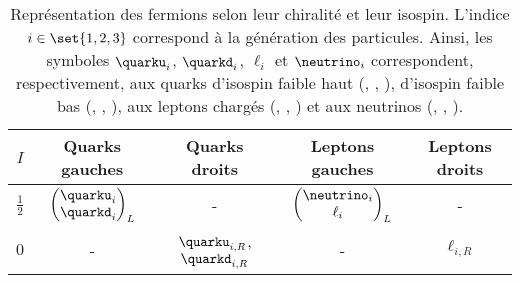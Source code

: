 \begin{table}[h]
\centering
\begin{tabular}{ccccc}
\toprule
$I$ & Quarks gauches & Quarks droits & Leptons gauches & Leptons droits\\
\midrule
$\frac{1}{2}$ & $\displaystyle \begin{pmatrix} \quarku_i \\ \quarkd_i \end{pmatrix}_L$ & - & $\displaystyle \begin{pmatrix} \neutrino_i \\ \ell_i \end{pmatrix}_L$ & - \\
$0$ & - & $\quarku_{i,R}$, $\quarkd_{i,R}$ & - & $\ell_{i,R}$\\
\bottomrule
\end{tabular}
\caption{Représentation des fermions selon leur chiralité et leur isospin. L'indice $i\in\set{1,2,3}$ correspond à la génération des particules. Ainsi, les symboles $\quarku_i$, $\quarkd_i$, $\ell_i$ et $\neutrino_i$ correspondent, respectivement, aux quarks d'isospin faible haut (\quarku, \quarkc, \quarkt), d'isospin faible bas (\quarkd, \quarks, \quarkb), aux leptons chargés (\ele, \mu, \tau) et aux neutrinos (\nuele, \numu, \nutau).}
\label{tab-chapter-MS-MSSM-section-formalisme-subsec-EW-rzpt_femrions_chiralite_isospin}
\end{table}
